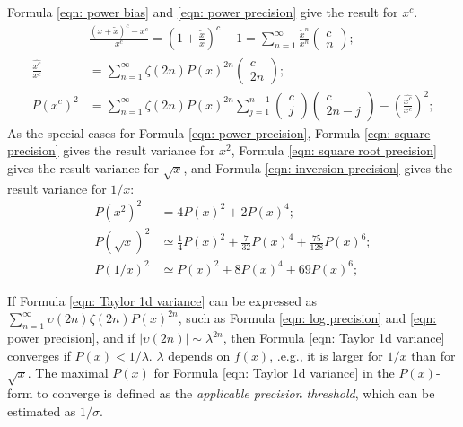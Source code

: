 \documentclass[twoside]{article}
\numberwithin{equation}{section}
\begin{document}
Formula \eqref{eqn: power bias} and \eqref{eqn: power precision} give the result for $x^c$.
\begin{align}
\label{eqn: power Taylor}
&\frac{(x + \tilde{x})^c - x^c}{x^c} = (1 + \frac{\tilde{x}}{x})^c - 1 = \sum_{n=1}^{\infty} \frac{\tilde{x}^n}{x^n} \begin{pmatrix} c \\ n \end{pmatrix}; \\
\label{eqn: power bias}
\frac{\widehat{x^c}}{x^c} &= \sum_{n=1}^{\infty} \zeta(2n) P(x)^{2n} \begin{pmatrix} c \\ 2n \end{pmatrix}; \\
\label{eqn: power precision}
P(x^c)^2 &= \sum_{n=1}^{\infty} \zeta(2n) P(x)^{2n} \sum_{j=1}^{n-1} \begin{pmatrix} c \\ j \end{pmatrix} \begin{pmatrix} c \\ 2n - j \end{pmatrix}
 - \left(\frac{\widehat{x^c}}{x^c}\right)^2;
\end{align}
As the special cases for Formula \eqref{eqn: power precision}, Formula \eqref{eqn: square precision} gives the result variance for $x^2$, Formula \eqref{eqn: square root precision} gives the result variance for $\sqrt{x}$, and Formula \eqref{eqn: inversion precision} gives the result variance for $1/x$: 
\begin{align}
\label{eqn: square precision}
P(x^2)^2 &= 4 P(x)^2 + 2 P(x)^4; \\
\label{eqn: square root precision}
P(\sqrt{x})^2 &\simeq \frac{1}{4} P(x)^2 + \frac{7}{32} P(x)^4 + \frac{75}{128} P(x)^6; \\
\label{eqn: inversion precision}
P(1/x)^2 &\simeq P(x)^2 + 8 P(x)^4 + 69 P(x)^6; 
\end{align}

If Formula \eqref{eqn: Taylor 1d variance} can be expressed as $\sum_{n=1}^{\infty} \upsilon(2n) \zeta(2n) P(x)^{2n}$, such as Formula \eqref{eqn: log precision} and \eqref{eqn: power precision}, and if $|\upsilon(2n)| \sim \lambda^{2n}$, then Formula \eqref{eqn: Taylor 1d variance} converges if $P(x) < 1/\lambda$.
$\lambda$ depends on $f(x)$, .e.g., it is larger for $1/x$ than for $\sqrt{x}$.
The maximal $P(x)$ for Formula \eqref{eqn: Taylor 1d variance} in the $P(x)$-form to converge is defined as the \emph{applicable precision threshold}, which can be estimated as $1/\sigma$.
\end{document}

